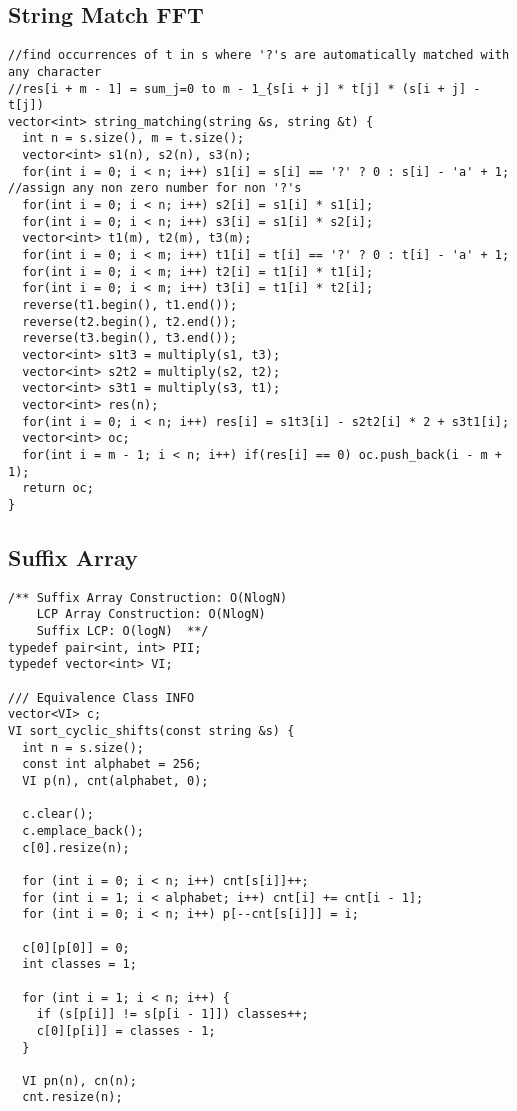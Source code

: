 \documentclass[FSZ,a4paper,onesided]{article}
\begin{document}
\begin{multicols*}{\COLS}
\subsection{String Match FFT}
\begin{lstlisting}
//find occurrences of t in s where '?'s are automatically matched with any character
//res[i + m - 1] = sum_j=0 to m - 1_{s[i + j] * t[j] * (s[i + j] - t[j])
vector<int> string_matching(string &s, string &t) {
  int n = s.size(), m = t.size();
  vector<int> s1(n), s2(n), s3(n);
  for(int i = 0; i < n; i++) s1[i] = s[i] == '?' ? 0 : s[i] - 'a' + 1; //assign any non zero number for non '?'s
  for(int i = 0; i < n; i++) s2[i] = s1[i] * s1[i];
  for(int i = 0; i < n; i++) s3[i] = s1[i] * s2[i];
  vector<int> t1(m), t2(m), t3(m);
  for(int i = 0; i < m; i++) t1[i] = t[i] == '?' ? 0 : t[i] - 'a' + 1;
  for(int i = 0; i < m; i++) t2[i] = t1[i] * t1[i];
  for(int i = 0; i < m; i++) t3[i] = t1[i] * t2[i];
  reverse(t1.begin(), t1.end());
  reverse(t2.begin(), t2.end());
  reverse(t3.begin(), t3.end());
  vector<int> s1t3 = multiply(s1, t3);
  vector<int> s2t2 = multiply(s2, t2);
  vector<int> s3t1 = multiply(s3, t1);
  vector<int> res(n);
  for(int i = 0; i < n; i++) res[i] = s1t3[i] - s2t2[i] * 2 + s3t1[i];
  vector<int> oc;
  for(int i = m - 1; i < n; i++) if(res[i] == 0) oc.push_back(i - m + 1);
  return oc;
}
\end{lstlisting}
\subsection{Suffix Array}
\begin{lstlisting}
/** Suffix Array Construction: O(NlogN)
    LCP Array Construction: O(NlogN)
    Suffix LCP: O(logN)  **/
typedef pair<int, int> PII;
typedef vector<int> VI;

/// Equivalence Class INFO
vector<VI> c;
VI sort_cyclic_shifts(const string &s) {
  int n = s.size();
  const int alphabet = 256;
  VI p(n), cnt(alphabet, 0);

  c.clear();
  c.emplace_back();
  c[0].resize(n);

  for (int i = 0; i < n; i++) cnt[s[i]]++;
  for (int i = 1; i < alphabet; i++) cnt[i] += cnt[i - 1];
  for (int i = 0; i < n; i++) p[--cnt[s[i]]] = i;

  c[0][p[0]] = 0;
  int classes = 1;

  for (int i = 1; i < n; i++) {
    if (s[p[i]] != s[p[i - 1]]) classes++;
    c[0][p[i]] = classes - 1;
  }

  VI pn(n), cn(n);
  cnt.resize(n);


\end{lstlisting}
\end{multicols*}
\end{document}
